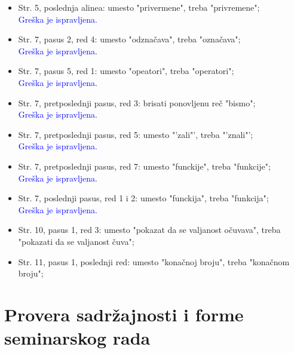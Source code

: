 \documentclass[a4paper]{report}
\newcommand{\odgovor}[1]{\textcolor{blue}{#1}}
\begin{document}
\begin{itemize}
  \item Str. 5, poslednja alinea: umesto "privermene", treba "privremene";\\
  \odgovor{Greška je ispravljena.}
  \item Str. 7, pasus 2, red 4: umesto "odznačava", treba "označava";\\
  \odgovor{Greška je ispravljena.}
  \item Str. 7, pasus 5, red 1: umesto "opeatori", treba "operatori";\\
  \odgovor{Greška je ispravljena.}
  \item Str. 7, pretposlednji pasus, red 3: brisati ponovljenu reč "bismo";\\
  \odgovor{Greška je ispravljena.}
  \item Str. 7, pretposlednji pasus, red 5: umesto "'zali"', treba "'znali"';\\
  \odgovor{Greška je ispravljena.}
  \item Str. 7, pretposlednji pasus, red 7: umesto "funckije", treba "funkcije";\\
  \odgovor{Greška je ispravljena.}
  \item Str. 7, poslednji pasus, red 1 i 2: umesto "funckija", treba "funkcija";\\
  \odgovor{Greška je ispravljena.}
  \item Str. 10, pasus 1, red 3: umesto "pokazat da se valjanost očuvava", treba "pokazati da se valjanost čuva";
  \item Str. 11, pasus 1, poslednji red: umesto "konačnoj broju", treba "konačnom broju";
\end{itemize}



\section{Provera sadržajnosti i forme seminarskog rada}
\end{document}
